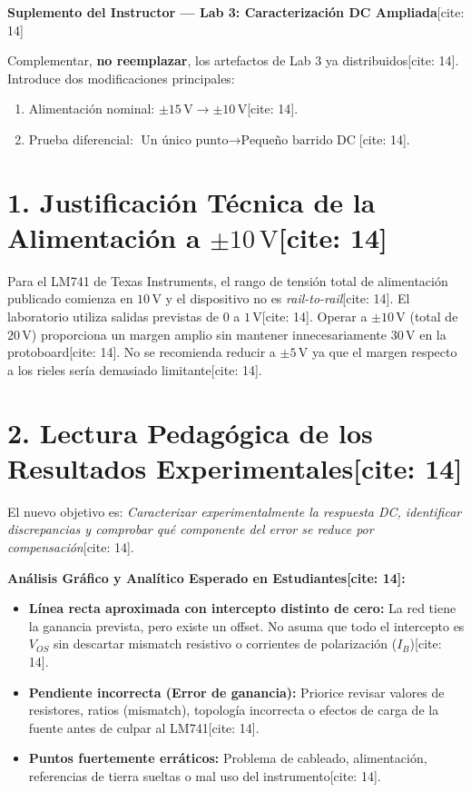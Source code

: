 \documentclass[11pt, a4paper]{article}
\begin{document}
\begin{center}
    \Large\textbf{\textcolor{ucbblue}{Suplemento del Instructor — Lab 3: Caracterización DC Ampliada}}[cite: 14]
\end{center}

\begin{tcolorbox}[colback=white, colframe=black, title=\textbf{Propósito de este Suplemento}]
    Complementar, \textbf{no reemplazar}, los artefactos de Lab 3 ya distribuidos[cite: 14]. Introduce dos modificaciones principales:
    \begin{enumerate}
        \item Alimentación nominal: $\boxed{\pm15\,\text{V} \rightarrow \pm10\,\text{V}}$[cite: 14].
        \item Prueba diferencial: $\boxed{\text{Un único punto} \rightarrow \text{Pequeño barrido DC}}$[cite: 14].
    \end{enumerate}
\end{tcolorbox}

\section*{1. Justificación Técnica de la Alimentación a $\pm10\,\text{V}$[cite: 14]}
Para el LM741 de Texas Instruments, el rango de tensión total de alimentación publicado comienza en $10\,\text{V}$ y el dispositivo no es \textit{rail-to-rail}[cite: 14]. El laboratorio utiliza salidas previstas de $0$ a $1\,\text{V}$[cite: 14]. Operar a $\pm10\,\text{V}$ (total de $20\,\text{V}$) proporciona un margen amplio sin mantener innecesariamente $30\,\text{V}$ en la protoboard[cite: 14]. No se recomienda reducir a $\pm5\,\text{V}$ ya que el margen respecto a los rieles sería demasiado limitante[cite: 14].

\section*{2. Lectura Pedagógica de los Resultados Experimentales[cite: 14]}
El nuevo objetivo es: \textit{Caracterizar experimentalmente la respuesta DC, identificar discrepancias y comprobar qué componente del error se reduce por compensación}[cite: 14].

\textbf{Análisis Gráfico y Analítico Esperado en Estudiantes[cite: 14]:}
\begin{itemize}
    \item \textbf{Línea recta aproximada con intercepto distinto de cero:} La red tiene la ganancia prevista, pero existe un offset. No asuma que todo el intercepto es $V_{OS}$ sin descartar mismatch resistivo o corrientes de polarización ($I_B$)[cite: 14].
    \item \textbf{Pendiente incorrecta (Error de ganancia):} Priorice revisar valores de resistores, ratios (mismatch), topología incorrecta o efectos de carga de la fuente antes de culpar al LM741[cite: 14].
    \item \textbf{Puntos fuertemente erráticos:} Problema de cableado, alimentación, referencias de tierra sueltas o mal uso del instrumento[cite: 14].
\end{itemize}
\end{document}

